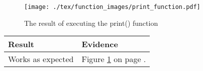 \begin{figure}[H]
    \texttt{[image: ./tex/function\_images/print\_function.pdf]}
    \caption{The result of executing the print() function} \label{fig:print_function_result}
\end{figure}



\begin{center}
    \begin{tabular}{|p{4cm}|p{8.5cm}|}
        \hline
        \textbf{Result} & \textbf{Evidence} \\ \hline
        Works as expected  & Figure \ref{fig:print_function_result} on page \pageref{fig:print_function_result}. \\ \hline
    \end{tabular}
\end{center}
